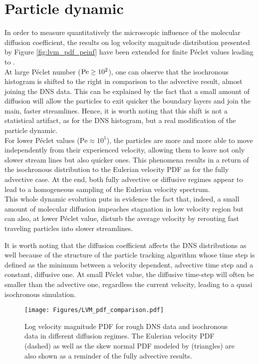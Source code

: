 \section{Particle dynamic}
In order to measure quantitatively the microscopic influence of the molecular diffusion coefficient, the results on log velocity magnitude distribution presented by Figure \ref{fig:lvm_pdf_peinf} have been extended for finite Péclet values leading to .\\
At large Péclet number ($\mathrm{Pe}\geq10^2$), one can observe that the isochronous histogram is shifted to the right in comparison to the advective result, almost joining the DNS data.
This can be explained by the fact that a small amount of diffusion will allow the particles to exit quicker the boundary layers and join the main, faster streamlines.
Hence, it is worth noting that this shift is not a statistical artifact, as for the DNS histogram, but a real modification of the particle dynamic.\\
For lower Péclet values ($\mathrm{Pe}\approx10^1$), the particles are more and more able to move independently from their experienced velocity, allowing them to leave not only slower stream lines but also quicker ones.
This phenomena results in a return of the isochronous distribution to the Eulerian velocity PDF as for the fully advective case.
At the end, both fully advective or diffusive regimes appear to lead to a homogeneous sampling of the Eulerian velocity spectrum.\\
This whole dynamic evolution puts in evidence the fact that, indeed, a small amount of molecular diffusion impeaches stagnation in low velocity region but can also, at lower Péclet value, disturb the average velocity by rerouting fast traveling particles into slower streamlines.

It is worth noting that the diffusion coefficient affects the DNS distributions as well because of the structure of the particle tracking algorithm whose time step is defined as the minimum between a velocity dependent, advective time step and a constant, diffusive one.
At small Péclet value, the diffusive time-step will often be smaller than the advective one, regardless the current velocity, leading to a quasi isochronous simulation.\\
\begin{figure}[t]
	\centering
	\texttt{[image: Figures/LVM\_pdf\_comparison.pdf]}
	\caption{Log velocity magnitude PDF for rough DNS data and isochronous data in different diffusion regimes. The Eulerian velocity PDF (dashed) as well as the skew normal PDF modeled by \citeauthor{Meyer2016} (triangles) are also shown as a reminder of the fully advective results.}
	\label{fig:lvm_pdf_pe}
\end{figure}

